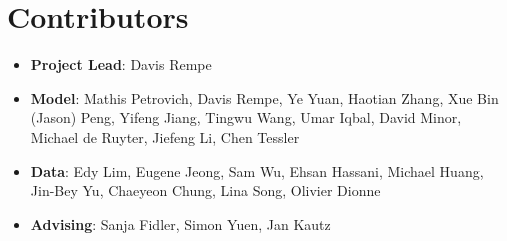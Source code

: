 \documentclass[10pt,logo,copyright]{nvidiatechreport}
\begin{document}
\section{Contributors}

\begin{itemize}
    \item \textbf{Project Lead}: Davis Rempe
    \item \textbf{Model}: Mathis Petrovich, Davis Rempe, Ye Yuan, Haotian Zhang, Xue Bin (Jason) Peng, Yifeng Jiang, Tingwu Wang, Umar Iqbal, David Minor, Michael de Ruyter, Jiefeng Li, Chen Tessler
    \item \textbf{Data}: Edy Lim, Eugene Jeong, Sam Wu, Ehsan Hassani, Michael Huang, Jin-Bey Yu, Chaeyeon Chung, Lina Song, Olivier Dionne
    \item \textbf{Advising}: Sanja Fidler, Simon Yuen, Jan Kautz 
\end{itemize}
\end{document}
